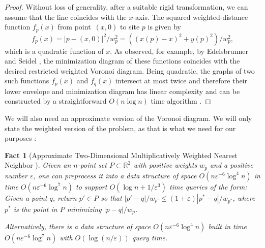 \documentclass[11pt]{article}
\newtheorem{fact}[theorem]{Fact}
\theoremstyle{remark}
\def\RR{\mathbb{R}}
\let\eps\varepsilon
\begin{document}
\begin{proof}
  Without loss of generality, after a suitable rigid transformation,
  we can assume that the line coincides with the $x$-axis.  The
  squared weighted-distance function $f_p(x)$ from point~$(x,0)$ to site $p$ is
  given by
  \[
    f_p(x) = |p-(x,0)|^2/w^2_p = ((x(p)-x)^2+y(p)^2)/w^2_p,
  \]
  which is a quadratic function of $x$.  As observed, for example, by
  Edelsbrunner and Seidel \cite{es-vda-86}, the minimization diagram
  of these functions coincides with the desired restricted weighted
  Voronoi diagram.  Being quadratic, the graphs of two such functions
  $f_p(x)$ and $f_q(x)$ intersect at most twice and therefore their
  lower envelope and minimization diagram has linear complexity and
  can be constructed by a straightforward $O(n \log n)$ time
  algorithm \cite[Theorem~6.1]{sa-dsstg-95}. 
\end{proof}



We will also need an approximate version of the Voronoi diagram.  We will only state the weighted version of the problem, as that is what we need for our purposes \cite[Theorem~2.16]{wann}:

\begin{fact}[Approximate Two-Dimensional Multiplicatively Weighted Nearest Neighbor \cite{wann}]
  \label{fact:2d-ann-wtd}
  Given an $n$-point set $P \subset \RR^2$ with positive weights
  $w_p$ and a positive number $\eps$, one can preprocess it into a data structure of space $O(n\eps^{-6}\log^4 n)$ in time $O(n\eps^{-6}\log^7 n)$ to support $O(\log n + 1/\eps^3)$  time queries of the form: Given a point $q$, return $p' \in P$ so that $|p'-q|/w_{p'} \leq (1+\eps) |p^*-q|/w_{p^*}$, where $p^*$ is the point in $P$ minimizing $|p-q|/w_p$.

  Alternatively, there is a data structure of space $O(n\eps^{-6}\log^4 n)$  built in time $O(n\eps^{-6}\log^7n)$ with $O(\log(n/\eps))$ query time.
\end{fact}

\iffalse
\end{document}

